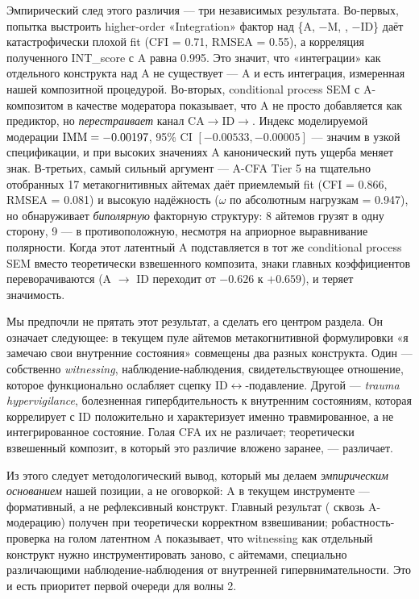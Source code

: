 Эмпирический след этого различия --- три независимых результата. Во-первых, попытка выстроить higher-order «Integration» фактор над \{A, $-$M, \EAF{}, $-$ID\} даёт катастрофически плохой fit (CFI = 0.71, RMSEA = 0.55), а корреляция полученного INT\_score с A равна 0.995. Это значит, что «интеграции» как отдельного конструкта над A не существует --- A и есть интеграция, измеренная нашей композитной процедурой. Во-вторых, conditional process SEM с A-композитом в качестве модератора показывает, что A не просто добавляется как предиктор, но \emph{перестраивает} канал CA$\to$ID$\to$\EAF{}. Индекс моделируемой модерации $\mathrm{IMM} = -0.00197$, 95\% CI $[-0.00533, -0.00005]$ --- значим в узкой спецификации, и при высоких значениях A канонический путь ущерба меняет знак. В-третьих, самый сильный аргумент --- A-CFA Tier 5 на тщательно отобранных 17 метакогнитивных айтемах даёт приемлемый fit (CFI = 0.866, RMSEA = 0.081) и высокую надёжность ($\omega$ по абсолютным нагрузкам = 0.947), но обнаруживает \emph{биполярную} факторную структуру: 8 айтемов грузят в одну сторону, 9 --- в противоположную, несмотря на априорное выравнивание полярности. Когда этот латентный A подставляется в тот же conditional process SEM вместо теоретически взвешенного композита, знаки главных коэффициентов переворачиваются (A $\to$ ID переходит от $-0.626$ к $+0.659$), и \IMM{} теряет значимость.

Мы предпочли не прятать этот результат, а сделать его центром раздела. Он означает следующее: в текущем пуле айтемов метакогнитивной формулировки «я замечаю свои внутренние состояния» совмещены два разных конструкта. Один --- собственно \emph{witnessing}, наблюдение-наблюдения, свидетельствующее отношение, которое функционально ослабляет сцепку ID$\leftrightarrow$\EAF{}-подавление. Другой --- \emph{trauma hypervigilance}, болезненная гипербдительность к внутренним состояниям, которая коррелирует с ID положительно и характеризует именно травмированное, а не интегрированное состояние. Голая CFA их не различает; теоретически взвешенный композит, в который это различие вложено заранее, --- различает.

Из этого следует методологический вывод, который мы делаем \emph{эмпирическим основанием} нашей позиции, а не оговоркой: A в текущем инструменте --- формативный, а не рефлексивный конструкт. Главный результат (\IMM{} сквозь A-модерацию) получен при теоретически корректном взвешивании; робастность-проверка на голом латентном A показывает, что witnessing как отдельный конструкт нужно инструментировать заново, с айтемами, специально различающими наблюдение-наблюдения от внутренней гипервнимательности. Это и есть приоритет первой очереди для волны 2.

